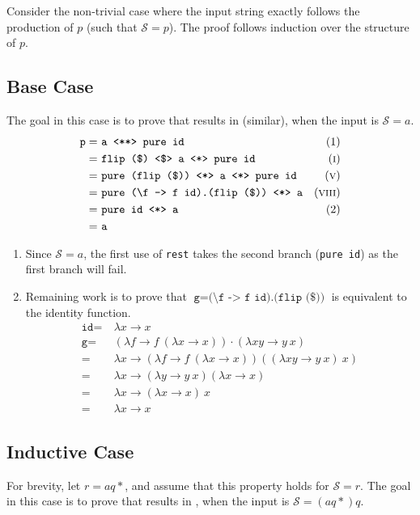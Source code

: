 Consider the non-trivial case where the input string exactly follows the production of $p$ (such that $\mathcal{S} = p$).
The proof follows induction over the structure of $p$.

\subsection{Base Case}
The goal in this case is to prove that  results in  (similar), when the input is $\mathcal{S} = a$.
\begin{align*}
    \texttt{p} =\ & \texttt{a \pa pure id} & \text{(1)} \\
    =\ & \texttt{flip (\$) \fmap a \ap pure id} & \equi[1] \\
    =\ & \texttt{pure (flip (\$)) \ap a \ap pure id} & \equi[5] \\
    =\ & \texttt{pure (\textbackslash f -> f id).(flip (\$)) \ap a} & \equi[8] \\
    =\ & \texttt{pure id \ap a} & \text{(2)} \\
    =\ & \texttt{a}
\end{align*}
\begin{enumerate}[(1)]
    \itemsep0em
    \item Since $\mathcal{S} = a$, the first use of \texttt{rest} takes the second branch (\texttt{pure id}) as the first branch will fail.
    \item Remaining work is to prove that $\texttt{g} = \texttt{(\textbackslash f -> f id).(flip (\$))}$ is equivalent to the identity function.
        \begin{align*}
            \texttt{id} =\ & \lambda x \to x \\
            \texttt{g} =\ & (\lambda f \to f\ (\lambda x \to x)) \cdot (\lambda xy \to y\ x) \\
            =\ & \lambda x \to (\lambda f \to f\ (\lambda x \to x))((\lambda xy \to y\ x)\ x) \\
            =\ & \lambda x \to (\lambda y \to y\ x)(\lambda x \to x) \\
            =\ & \lambda x \to (\lambda x \to x)\ x \\
            =\ & \lambda x \to x
        \end{align*}
\end{enumerate}

\subsection{Inductive Case}
For brevity, let $r = aq*$, and assume that this property holds for $\mathcal{S} = r$.
The goal in this case is to prove that  results in , when the input is $\mathcal{S} = (aq*)q$.

